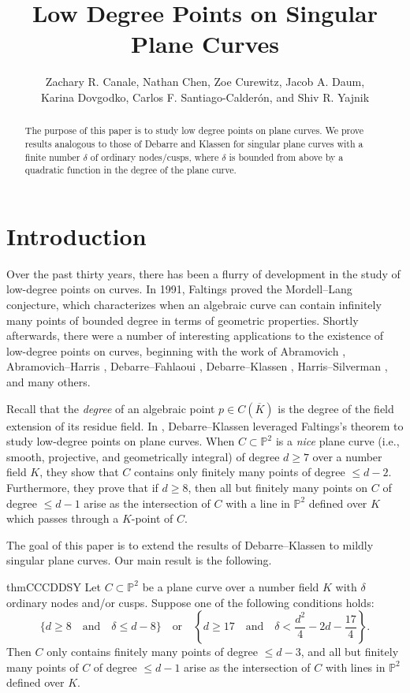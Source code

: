 \documentclass[fontsize=11pt,reqno]{amsart}
\title{Low Degree Points on Singular Plane Curves}
\author[Canale, Chen, Curewitz, Daum, Dovgodko, Santiago-Calder\'{o}n, Yajnik]{Zachary R. Canale, Nathan Chen, Zoe Curewitz, Jacob A. Daum, \\Karina Dovgodko, Carlos F. Santiago-Calder\'{o}n, and Shiv R. Yajnik}
\theoremstyle{definition}
\theoremstyle{remark}
\renewcommand{\P}{\mathbb{P}}
\begin{document}
\begin{abstract}
The purpose of this paper is to study low degree points on plane curves. We prove results analogous to those of Debarre and Klassen for singular plane curves with a finite number $\delta$ of ordinary nodes/cusps, where $\delta$ is bounded from above by a quadratic function in the degree of the plane curve.
\end{abstract}

\maketitle


\section{Introduction}

Over the past thirty years, there has been a flurry of development in the study of low-degree points on curves. In 1991, Faltings proved the Mordell--Lang conjecture, which characterizes when an algebraic curve can contain infinitely many points of bounded degree in terms of geometric properties. Shortly afterwards, there were a number of interesting applications to the existence of low-degree points on curves, beginning with the work of Abramovich \cite{Abramovich91}, Abramovich--Harris \cite{AH91}, Debarre--Fahlaoui \cite{DF93}, Debarre--Klassen \cite{DK94}, Harris--Silverman \cite{HS1991}, and many others.

Recall that the \textit{degree} of an algebraic point $p \in C(\overline{K})$ is the degree of the field extension of its residue field. In \cite{DK94}, Debarre--Klassen leveraged Faltings's theorem to study low-degree points on plane curves. When $C \subset \P^2$ is a \textit{nice} plane curve (i.e., smooth, projective, and geometrically integral) of degree $d \geq 7$ over a number field $K$, they show that $C$ contains only finitely many points of degree $\leq d-2$. Furthermore, they prove that if $d\geq 8$, then all but finitely many points on $C$ of degree $\leq d-1$ arise as the intersection of $C$ with a line in $\P^2$ defined over $K$ which passes through a $K$-point of $C$.

The goal of this paper is to extend the results of Debarre--Klassen to mildly singular plane curves. Our main result is the following.

\begin{restatable}{thm}{CCCDDSY}\label{thm:CCCDDSY} Let $C \subset \P^{2}$ be a plane curve over a number field $K$ with $\delta$ ordinary nodes and/or cusps. Suppose one of the following conditions holds:
\[ \{ d \geq 8 \quad \text{and} \quad \delta \leq d-8 \} \quad \text{or} \quad \left\{ d \geq 17 \quad \text{and} \quad \delta < \frac{d^{2}}{4} - 2d - \frac{17}{4} \right\}. \]
Then $C$ only contains finitely many points of degree $\leq d-3$, and all but finitely many points of $C$ of degree $\leq d-1$ arise as the intersection of $C$ with lines in $\P^2$ defined over $K$.
\end{restatable}
\end{document}
